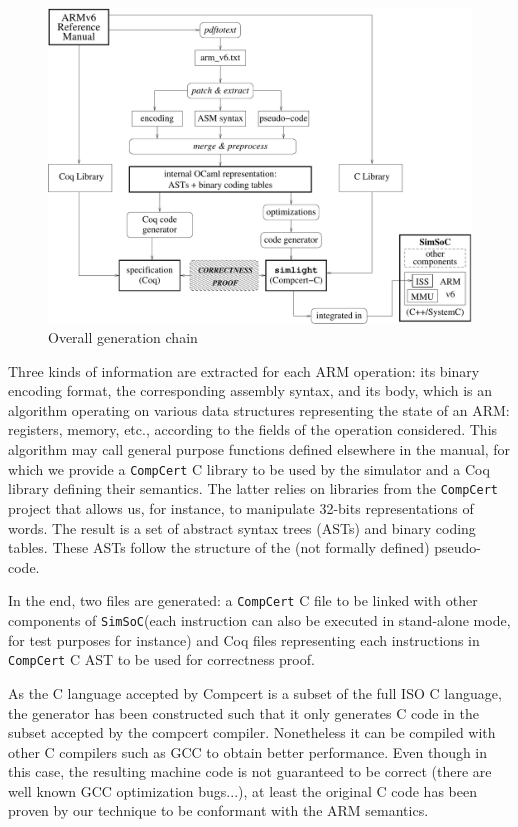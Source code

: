 \documentclass[a4paper, conference]{IEEEtran}
\newcommand{\compcert}{\texttt{CompCert}\xspace}
\newcommand{\simsoc}{\texttt{SimSoC}\xspace}
\newcommand{\compcert}{Compcert\xspace}
\begin{document}
\begin{figure}
\hfil\includegraphics[width=\linewidth]{fig/fullarchi.pdf}
\caption{Overall generation chain}
\label{fig:arch}
\end{figure}

Three kinds of information are extracted for each ARM operation: its
binary encoding format, the corresponding assembly syntax, and its
body, which is an algorithm operating on various data structures
representing the state of an ARM: registers, memory, etc., according
to the fields of the operation considered. This algorithm may call
general purpose functions defined elsewhere in the manual, for which
we provide a \compcert C library to be used by the simulator and a Coq
library defining their semantics. The latter relies on libraries from
the \compcert project that allows us, for instance, to manipulate
32-bits representations of words. The result is a set of abstract
syntax trees (ASTs) and binary coding tables. These ASTs follow the
structure of the (not formally defined) pseudo-code.

In the end, two files are generated: a \compcert C file to be linked
with other components of \simsoc (each instruction can also be
executed in stand-alone mode, for test purposes for instance) and
Coq files representing each instructions in \compcert C AST to be used
for correctness proof.

As the C language accepted by Compcert is a subset of the full ISO C
language, the generator has been constructed such that it only
generates C code in the subset accepted by the compcert compiler.
Nonetheless it can be compiled with other C compilers such as GCC
to obtain better performance. Even though in this case, the resulting
machine code is not guaranteed to be correct (there are well known
GCC optimization bugs...), at least the original C code has been
proven by our technique to be conformant with the ARM semantics.
\end{document}
